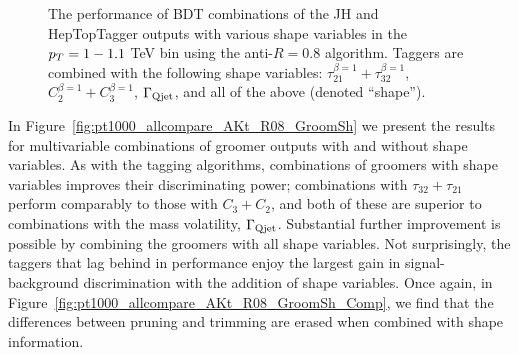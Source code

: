 \begin{figure}
\centering
{}
\caption{The performance of BDT combinations of the JH and HepTopTagger outputs with various shape variables in the $p_T = 1-1.1$ TeV bin using the anti-\kT $R=0.8$ algorithm. Taggers are combined with the following shape variables: $\tau_{21}^{\beta=1}+\tau_{32}^{\beta=1}$, $C_{2}^{\beta=1}+C_{3}^{\beta=1}$, $\Gamma_{\rm Qjet}$, and all of the above (denoted ``shape'').}
\label{fig:pt1000_allcompare_AKt_R08_TagSh}
\end{figure}

In Figure~\ref{fig:pt1000_allcompare_AKt_R08_GroomSh} we present the results for multivariable combinations of groomer outputs with and without shape variables. As with the tagging algorithms, combinations of groomers with shape variables improves their discriminating power; combinations with $\tau_{32}+\tau_{21}$ perform comparably to those with $C_3+C_2$, and both of these are superior to combinations with the mass volatility, $\Gamma_{\rm Qjet}$. Substantial further improvement is possible by combining the groomers with all shape variables. Not surprisingly, the taggers that lag behind in performance enjoy the largest gain in signal-background discrimination with the addition of shape variables. Once again, in Figure~\ref{fig:pt1000_allcompare_AKt_R08_GroomSh_Comp}, we find that the differences between pruning and trimming are erased when combined with shape information.

